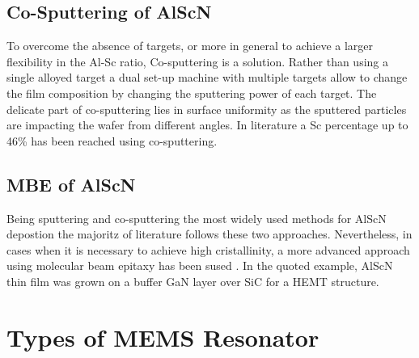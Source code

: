 \subsection{Co-Sputtering of AlScN}
To overcome the absence of targets, or more in general to achieve a larger flexibility in the Al-Sc ratio, Co-sputtering is a solution. Rather than using a single alloyed target a dual set-up machine with multiple targets allow to change the film composition by changing the sputtering power of each target. The delicate part of co-sputtering lies in surface uniformity as the sputtered particles are impacting the wafer from different angles. In literature a Sc percentage up to 46\% \cite{lu_development_2019} has been reached using co-sputtering.

\subsection{MBE of AlScN}
Being sputtering and co-sputtering the most widely used methods for AlScN depostion the majoritz of literature follows these two approaches. Nevertheless, in cases when it is necessary to achieve high cristallinity, a more advanced approach using molecular beam epitaxy has been sused \cite{hardy_epitaxial_2017}. In the quoted example, AlScN thin film was grown on a buffer GaN layer over SiC for a HEMT structure.

\section{Types of MEMS Resonator}
